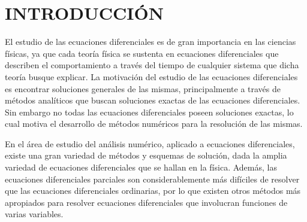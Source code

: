 \chapter{INTRODUCCIÓN}
El estudio de las ecuaciones diferenciales es de gran importancia en las ciencias físicas, ya que cada teoría física se sustenta en ecuaciones diferenciales que describen el comportamiento a través del tiempo de cualquier sistema que dicha teoría busque explicar. La motivación del estudio de las ecuaciones diferenciales es encontrar soluciones generales de las mismas, principalmente a través de métodos analíticos que buscan soluciones exactas de las ecuaciones diferenciales. Sin embargo no todas las ecuaciones diferenciales poseen soluciones exactas, lo cual motiva el desarrollo de métodos numéricos para la resolución de las mismas.

En el área de estudio del análisis numérico, aplicado a ecuaciones diferenciales, existe una gran variedad de métodos y esquemas de solución, dada la amplia variedad de ecuaciones diferenciales que se hallan en la física. Además, las ecuaciones diferenciales parciales son considerablemente más difíciles de resolver que las ecuaciones diferenciales ordinarias, por lo que existen otros métodos más apropiados para resolver ecuaciones diferenciales que involucran funciones de varias variables.

